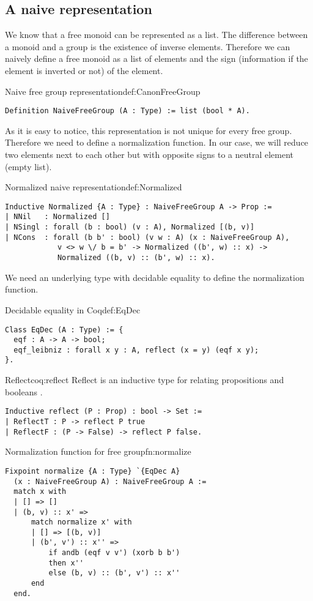 \subsection{A naive representation}
We know that a free monoid can be represented as a list. The difference between a monoid and a group is the existence of inverse elements. Therefore we can naively define a free monoid as a list of elements and the sign (information if the element is inverted or not) of the element.
\begin{defi}{Naive free group representation}{def:CanonFreeGroup}
\begin{verbatim}
Definition NaiveFreeGroup (A : Type) := list (bool * A).
\end{verbatim}
\end{defi}
As it is easy to notice, this representation is not unique for every free group. Therefore we need to define a normalization function. In our case, we will reduce two elements next to each other but with opposite signs to a neutral element (empty list).
\begin{defi}{Normalized naive representation}{def:Normalized}
\begin{verbatim}
Inductive Normalized {A : Type} : NaiveFreeGroup A -> Prop :=
| NNil   : Normalized []
| NSingl : forall (b : bool) (v : A), Normalized [(b, v)]
| NCons  : forall (b b' : bool) (v w : A) (x : NaiveFreeGroup A), 
            v <> w \/ b = b' -> Normalized ((b', w) :: x) ->
            Normalized ((b, v) :: (b', w) :: x).
\end{verbatim}
\end{defi}
We need an underlying type with decidable equality to define the normalization function.
\begin{defi}{Decidable equality in Coq}{def:EqDec}
\begin{verbatim}
Class EqDec (A : Type) := { 
  eqf : A -> A -> bool;
  eqf_leibniz : forall x y : A, reflect (x = y) (eqf x y);
}.
\end{verbatim}
\end{defi}
\begin{coq}{Reflect}{coq:reflect}
Reflect is an inductive type for
relating propositions and booleans \cite{coqDoc}.
\begin{verbatim}
Inductive reflect (P : Prop) : bool -> Set :=
| ReflectT : P -> reflect P true
| ReflectF : (P -> False) -> reflect P false.
\end{verbatim}
\end{coq}
\begin{func}{Normalization function for free group}{fn:normalize}
\begin{verbatim}
Fixpoint normalize {A : Type} `{EqDec A} 
  (x : NaiveFreeGroup A) : NaiveFreeGroup A :=
  match x with
  | [] => []
  | (b, v) :: x' => 
      match normalize x' with
      | [] => [(b, v)]
      | (b', v') :: x'' => 
          if andb (eqf v v') (xorb b b')
          then x''
          else (b, v) :: (b', v') :: x''
      end
  end.
\end{verbatim}
\end{func}
